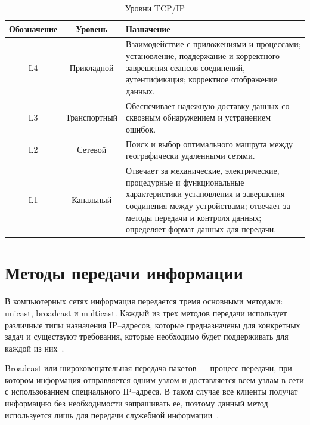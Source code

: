 \begin{table}[ht]
	\begin{center}
		\begin{threeparttable}
			\caption{\label{tab:tcp-ip} Уровни TCP/IP}
			\begin{tabular}{|c|c|>{\arraybackslash}p{9cm}|}
				\hline
				\textbf{Обозначение} & \textbf{Уровень} & \textbf{Назначение} \\ \hline
				L4  	& Прикладной   & Взаимодействие с приложениями и процессами; установление, поддержание и корректного заврешения сеансов соединений, аутентификация; корректное отображение данных. \\ \hline
				L3      & Транспортный &  Обеспечивает надежную доставку данных со сквозным обнаружением и устранением ошибок. \\ \hline
				L2  	& Сетевой	   & Поиск и выбор оптимального машрута между географически удаленными сетями. \\ \hline
				L1    	& Канальный	   & Отвечает за механические, электрические, процедурные и функциональные характеристики установления и завершения соединения между устройствами; отвечает за методы передачи и контроля данных; определяет формат данных для передачи.\\ \hline
			\end{tabular}
		\end{threeparttable}
	\end{center}
\end{table}


\section{Методы передачи информации}

В компьютерных сетях информация передается тремя основными методами: unicast, broadcast и multicast. 
Каждый из трех методов передачи использует различные типы назначения IP--адресов, которые предназначены для конкретных задач и существуют требования, которые необходимо будет поддерживать для каждой из них~\cite{method_streaming}.

Broadcast или широковещательная передача пакетов --- процесс передачи, при котором информация отправляется одним узлом и доставляется всем узлам в сети с использованием специального IP--адреса. В таком случае все клиенты получат информацию без необходимости запрашивать ее, поэтому данный метод используется лишь для передачи служебной информации~\cite{method_streaming, differece_method_streaming_2}.

